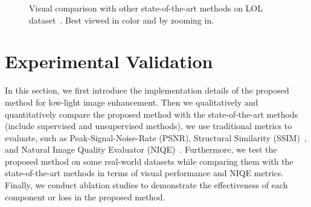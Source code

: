 \documentclass[journal]{IEEEtran}
\begin{document}
\begin{figure*}
\begin{center}
{    }\hspace*{-5mm}
    \hspace*{-5mm}
    \hspace*{-5mm}
    \caption{Visual comparison with other state-of-the-art methods on LOL dataset~\cite{Chen2018Retinex}. Best viewed in color and by zooming in.}
    \label{fig:LOL}
    \end{center}
\end{figure*}

\section{Experimental Validation}
\label{experiment}
In this section, we first introduce the implementation details of the proposed method for low-light image enhancement. Then we qualitatively and quantitatively compare the proposed method with the state-of-the-art methods (include supervised and unsupervised methods), we use traditional metrics to evaluate, such as Peak-Signal-Noise-Rate (PSNR), Structural Similarity (SSIM)~\cite{wang2004image}, and Natural Image Quality Evaluator (NIQE)~\cite{mittal2012making}. Furthermore, we test the proposed method on some real-world datasets while comparing them with the state-of-the-art methods in terms of visual performance and NIQE metrics. Finally, we conduct ablation studies to demonstrate the effectiveness of each component or loss in the proposed method.
\end{document}
